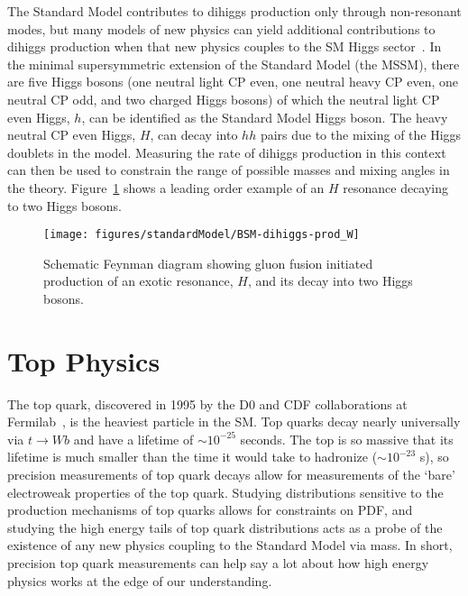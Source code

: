 The Standard Model contributes to dihiggs production only through non-resonant modes, but many models of new physics can yield additional contributions to dihiggs production when that new physics couples to the SM Higgs sector~\cite{Dolan:2012ac}. In the minimal supersymmetric extension of the Standard Model (the MSSM), there are five Higgs bosons (one neutral light CP even, one neutral heavy CP even, one neutral CP odd, and two charged Higgs bosons) of which the neutral light CP even Higgs, $h$, can be identified as the Standard Model Higgs boson. The heavy neutral CP even Higgs, $H$, can decay into $hh$ pairs due to the mixing of the Higgs doublets in the model. Measuring the rate of dihiggs production in this context can then be used to constrain the range of possible masses and mixing angles in the theory. Figure~\ref{fig:BSM-dihiggs-prod} shows a leading order example of an $H$ resonance decaying to two Higgs bosons. %
\begin{figure}[h!]
\centering
\label{fig:BSM-dihiggs-prod}
\texttt{[image: figures/standardModel/BSM-dihiggs-prod\_W]}
\caption{Schematic Feynman diagram showing gluon fusion initiated production of an exotic resonance, $H$, and its decay into two Higgs bosons.}
\end{figure}

\section{Top Physics}
The top quark, discovered in 1995 by the D0 and CDF collaborations at Fermilab~\cite{CDF, D0}, is the heaviest particle in the SM. Top quarks decay nearly universally via $t\rightarrow Wb$ and have a lifetime of $\sim 10^{-25}$ seconds. %
The top is so massive that its lifetime is much smaller than the time it would take to hadronize ($\sim 10^{-23}$ s), so precision measurements of top quark decays allow for measurements of the `bare' electroweak properties of the top quark. Studying distributions sensitive to the production mechanisms of top quarks allows for constraints on PDF, and studying the high energy tails of top quark distributions acts as a probe of the existence of any new physics coupling to the Standard Model via mass. In short, precision top quark measurements can help say a lot about how high energy physics works at the edge of our understanding.


